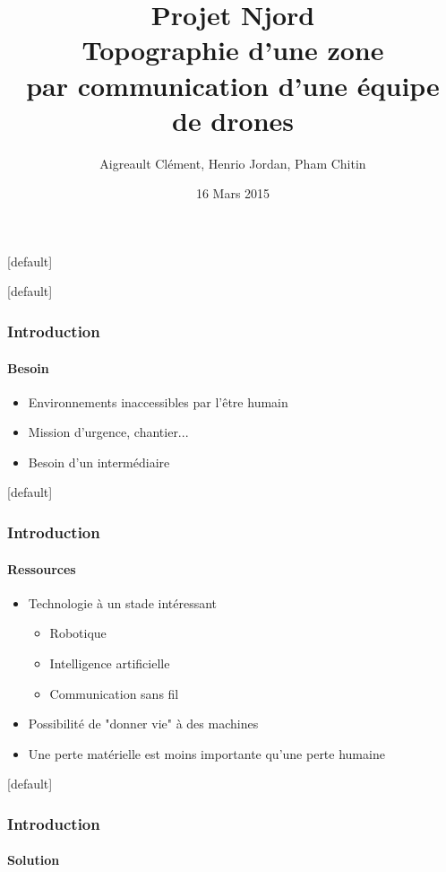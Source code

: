 \documentclass{beamer}
\title{\textbf{Projet Njord}\\ Topographie d'une zone \\ par communication d'une équipe de drones}
\author{Aigreault Clément, Henrio Jordan, Pham Chitin}
\date{16 Mars 2015}
\begin{document}
  {
    \makeatletter
    [default]
    \def\beamer@entrycode{\vspace*{-\headheight}}
    \makeatother
    \begin{frame}
      \titlepage
    \end{frame}
  }
  
  {
    \makeatletter
    [default]
    \def\beamer@entrycode{\vspace*{-\headheight}}
    \makeatother
    \begin{frame}
      \frametitle{Introduction}
      \framesubtitle{Besoin}
      
      \begin{itemize}
	\item Environnements inaccessibles par l'être humain
	\item Mission d'urgence, chantier...
	\item Besoin d'un intermédiaire
      \end{itemize}
    \end{frame}

    \makeatletter
    [default]
    \def\beamer@entrycode{\vspace*{-\headheight}}
    \makeatother
    \begin{frame}
      \frametitle{Introduction}
      \framesubtitle{Ressources}
      
      \begin{itemize}
	\item Technologie à un stade intéressant
	\begin{itemize}
	  \item Robotique
	  \item Intelligence artificielle
	  \item Communication sans fil
	\end{itemize}
	\item Possibilité de "donner vie" à des machines 
	\item Une perte matérielle est moins importante qu'une perte humaine
      \end{itemize}
    \end{frame}
    
    \makeatletter
    [default]
    \def\beamer@entrycode{\vspace*{-\headheight}}
    \makeatother
    \begin{frame}
      \frametitle{Introduction}
      \framesubtitle{Solution}
      

\end{frame}}
\end{document}
